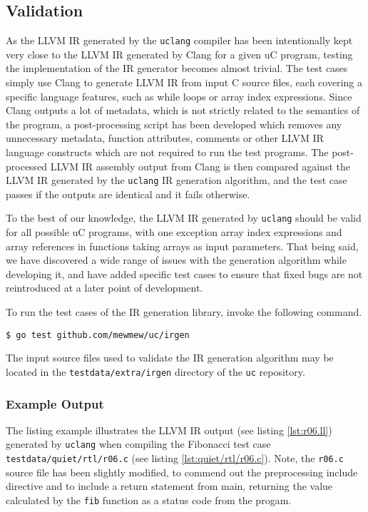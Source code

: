\subsection{Validation}
\label{sec:irgen_validation}

As the LLVM IR generated by the \texttt{uclang} compiler has been intentionally kept very close to the LLVM IR generated by Clang for a given uC program, testing the implementation of the IR generator becomes almost trivial. The test cases simply use Clang to generate LLVM IR from input C source files, each covering a specific language features, such as while loops or array index expressions. Since Clang outputs a lot of metadata, which is not strictly related to the semantics of the program, a post-processing script has been developed which removes any unnecessary metadata, function attributes, comments or other LLVM IR language constructs which are not required to run the test programs. The post-processed LLVM IR assembly output from Clang is then compared against the LLVM IR generated by the \texttt{uclang} IR generation algorithm, and the test case passes if the outputs are identical and it fails otherwise.

To the best of our knowledge, the LLVM IR generated by \texttt{uclang} should be valid for all possible uC programs, with one exception array index expressions and array references in functions taking arrays as input parameters. That being said, we have discovered a wide range of issues with the generation algorithm while developing it, and have added specific test cases to ensure that fixed bugs are not reintroduced at a later point of development.

To run the test cases of the IR generation library, invoke the following command.

\begin{verbatim}
$ go test github.com/mewmew/uc/irgen
\end{verbatim}

The input source files used to validate the IR generation algorithm may be located in the \texttt{testdata/extra/irgen} directory of the \texttt{uc} repository.

\subsubsection{Example Output}

The listing example illustrates the LLVM IR output (see listing \ref{lst:r06.ll}) generated by \texttt{uclang} when compiling the Fibonacci test case \texttt{testdata/quiet/rtl/r06.c} (see listing \ref{lst:quiet/rtl/r06.c}). Note, the \texttt{r06.c} source file has been slightly modified, to commend out the preprocessing include directive and to include a return statement from main, returning the value calculated by the \texttt{fib} function as a status code from the progam.


